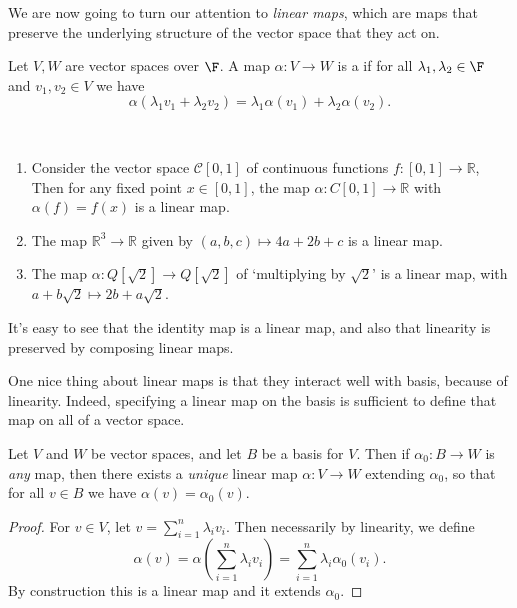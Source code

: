 \documentclass[a4paper]{scrartcl}
\begin{document}
We are now going to turn our attention to \emph{linear maps}, which are maps that preserve the underlying structure of the vector space that they act on.

\begin{definition}
    Let $V, W$ are vector spaces over $\F$.
    A map $\alpha: V \rightarrow W$ is a  if for all $\lambda_1, \lambda_2 \in \F$ and $v_1, v_2 \in V$ we have 
    $$
    \alpha(\lambda_1 v_1 + \lambda_2 v_2) = \lambda_1\alpha(v_1) + \lambda_2 \alpha(v_2).
    $$
\end{definition}

\begin{example}~
    \vspace{-1.5\baselineskip}
    \begin{enumerate}[label=(\roman*)]
        \item Consider the vector space $\mathcal{C}[0, 1]$ of continuous functions $f:[0, 1] \rightarrow \mathbb{R}$, Then for any fixed point $x \in [0, 1]$, the map $\alpha: C[0, 1] \rightarrow \mathbb{R}$ with $\alpha(f) = f(x)$ is a linear map.
        \item The map $\mathbb{R}^3 \rightarrow \mathbb{R}$ given by $(a, b, c) \mapsto 4a + 2b + c$ is a linear map.
        \item The map $\alpha: Q[\sqrt{2}] \rightarrow Q[\sqrt{2}]$ of `multiplying by $\sqrt{2}$' is a linear map, with $a + b \sqrt{2} \mapsto 2b + a \sqrt{2}$.
    \end{enumerate}
\end{example}

It's easy to see that the identity map is a linear map, and also that linearity is preserved by composing linear maps.

One nice thing about linear maps is that they interact well with basis, because of linearity. Indeed, specifying a linear map on the basis is sufficient to define that map on all of a vector space.

\begin{lemma}\label{lemma:extend-map}
    Let $V$ and $W$ be vector spaces, and let $B$ be a basis for $V$. Then if $\alpha_0: B \rightarrow W$ is \emph{any} map, then there exists a \emph{unique} linear map $\alpha: V \rightarrow W$ extending $\alpha_0$, so that for all $v \in B$ we have $\alpha(v) = \alpha_0(v)$.
\end{lemma}
\begin{proof}
    For $v \in V$, let $v = \sum_{i = 1}^n \lambda_i v_i$. Then necessarily by linearity, we define
    $$
    \alpha(v) = \alpha\left(\sum_{i = 1}^n \lambda_i v_i\right) = \sum_{i = 1}^n \lambda_i \alpha_0 (v_i).
    $$
    By construction this is a linear map and it extends $\alpha_0$.
\end{proof}
\end{document}
